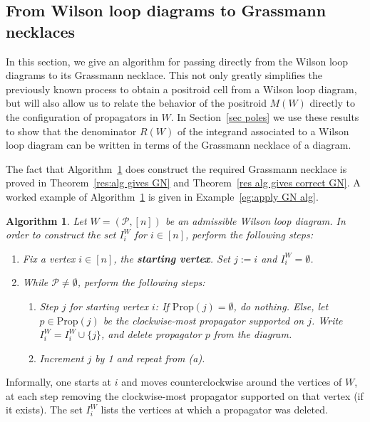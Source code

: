 \documentclass[11pt]{article}
\newcommand{\cP}{\mathcal{P}}
\newcommand{\Prop}{\textrm{Prop}}
\newtheorem{algorithm}[thm]{Algorithm}
\theoremstyle{remark}
\theoremstyle{definition}
\begin{document}
\subsection{From Wilson loop diagrams to Grassmann necklaces}\label{sec:GN alg}

In this section, we give an algorithm for passing directly from the Wilson loop diagrams to its Grassmann necklace. This not only greatly simplifies the previously known process to obtain a positroid cell from a Wilson loop diagram, but will also allow us to relate the behavior of the positroid $M(W)$ directly to the configuration of propagators in $W$. In Section~\ref{sec poles} we use these results to show that the denominator $R(W)$ of the integrand associated to a Wilson loop diagram can be written in terms of the Grassmann necklace of a diagram. 

The fact that Algorithm~\ref{alg:put GN on WLD} does construct the required Grassmann necklace is proved in Theorem~\ref{res:alg gives GN} and Theorem~\ref{res alg gives correct GN}. A worked example of Algorithm~\ref{alg:put GN on WLD} is given in Example~\ref{eg:apply GN alg}.

\begin{algorithm}\label{alg:put GN on WLD}
Let $W = (\cP, [n])$ be an admissible Wilson loop diagram. In order to construct the set $I_i^W$ for $i \in [n]$, perform the following steps:

\begin{enumerate}
\item Fix a vertex $i \in [n]$, the {\bf starting vertex}. Set $j:=i$ and $I_i^W = \emptyset$.
\item While $\cP \neq \emptyset$, perform the following steps:
\begin{enumerate}
\item {\em Step $j$ for starting vertex $i$}: If $\Prop(j) = \emptyset$, do nothing. Else, let $p \in \Prop(j)$ be the clockwise-most propagator supported on $j$. Write $I_i^W = I_i^W\cup \{j\}$, and delete propagator $p$ from the diagram.
\item Increment $j$ by 1 and repeat from (a).
\end{enumerate}
\end{enumerate}
\end{algorithm}

Informally, one starts at $i$ and moves counterclockwise around the vertices of $W$, at each step removing the clockwise-most propagator supported on that vertex (if it exists). The set $I_i^W$ lists the vertices at which a propagator was deleted. 
\end{document}
